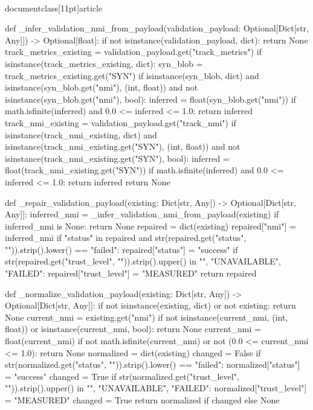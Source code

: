 \\documentclass[11pt]{article}
\begin{document}
\begin{CodeBlock}
def _infer_validation_nmi_from_payload(validation_payload: Optional[Dict[str, Any]]) -> Optional[float]:
    if not isinstance(validation_payload, dict):
        return None
    track_metrics_existing = validation_payload.get("track_metrics")
    if isinstance(track_metrics_existing, dict):
        syn_blob = track_metrics_existing.get("SYN")
        if isinstance(syn_blob, dict) and isinstance(syn_blob.get("nmi"), (int, float)) and not isinstance(syn_blob.get("nmi"), bool):
            inferred = float(syn_blob.get("nmi"))
            if math.isfinite(inferred) and 0.0 <= inferred <= 1.0:
                return inferred
    track_nmi_existing = validation_payload.get("track_nmi")
    if isinstance(track_nmi_existing, dict) and isinstance(track_nmi_existing.get("SYN"), (int, float)) and not isinstance(track_nmi_existing.get("SYN"), bool):
        inferred = float(track_nmi_existing.get("SYN"))
        if math.isfinite(inferred) and 0.0 <= inferred <= 1.0:
            return inferred
    return None


def _repair_validation_payload(existing: Dict[str, Any]) -> Optional[Dict[str, Any]]:
    inferred_nmi = _infer_validation_nmi_from_payload(existing)
    if inferred_nmi is None:
        return None
    repaired = dict(existing)
    repaired["nmi"] = inferred_nmi
    if "status" in repaired and str(repaired.get("status", "")).strip().lower() == "failed":
        repaired["status"] = "success"
    if str(repaired.get("trust_level", "")).strip().upper() in {"", "UNAVAILABLE", "FAILED"}:
        repaired["trust_level"] = "MEASURED"
    return repaired


def _normalize_validation_payload(existing: Dict[str, Any]) -> Optional[Dict[str, Any]]:
    if not isinstance(existing, dict) or not existing:
        return None
    current_nmi = existing.get("nmi")
    if not isinstance(current_nmi, (int, float)) or isinstance(current_nmi, bool):
        return None
    current_nmi = float(current_nmi)
    if not math.isfinite(current_nmi) or not (0.0 <= current_nmi <= 1.0):
        return None
    normalized = dict(existing)
    changed = False
    if str(normalized.get("status", "")).strip().lower() == "failed":
        normalized["status"] = "success"
        changed = True
    if str(normalized.get("trust_level", "")).strip().upper() in {"", "UNAVAILABLE", "FAILED"}:
        normalized["trust_level"] = "MEASURED"
        changed = True
    return normalized if changed else None



\end{CodeBlock}
\end{document}
